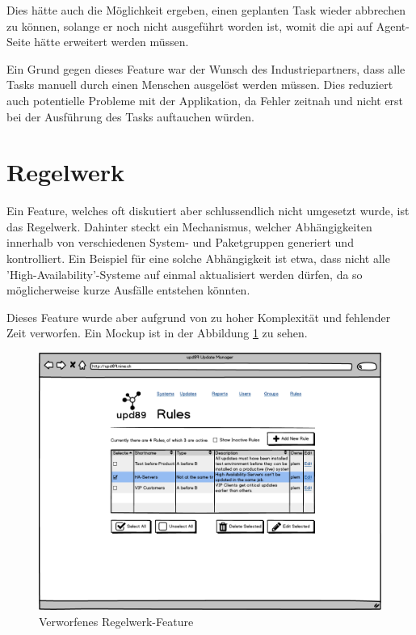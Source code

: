 Dies hätte auch die Möglichkeit ergeben, einen geplanten Task wieder abbrechen zu können, solange er noch nicht ausgeführt worden ist, womit die \gls{api} auf Agent-Seite hätte erweitert werden müssen.

Ein Grund gegen dieses Feature war der Wunsch des Industriepartners, dass alle Tasks manuell durch einen Menschen ausgelöst werden müssen. Dies reduziert auch potentielle Probleme mit der Applikation, da Fehler zeitnah und nicht erst bei der Ausführung des Tasks auftauchen würden.

\section{Regelwerk} \label{sec:ausblick:regelwerk}

Ein Feature, welches oft diskutiert aber schlussendlich nicht umgesetzt wurde, ist das Regelwerk. Dahinter steckt ein Mechanismus, welcher Abhängigkeiten innerhalb von verschiedenen System- und Paketgruppen generiert und kontrolliert. Ein Beispiel für eine solche Abhängigkeit ist etwa, dass nicht alle 'High-Availability'-Systeme auf einmal aktualisiert werden dürfen, da so möglicherweise kurze Ausfälle entstehen könnten. 

Dieses Feature wurde aber aufgrund von zu hoher Komplexität und fehlender Zeit verworfen. Ein Mockup ist in der Abbildung \ref{fig:ergebnis:rules} zu sehen.

\begin{figure}[H]
	\centering
	\includegraphics[width=\linewidth]{files/mockups/rules}
	\caption{Verworfenes Regelwerk-Feature}
	\label{fig:ergebnis:rules}
\end{figure}
